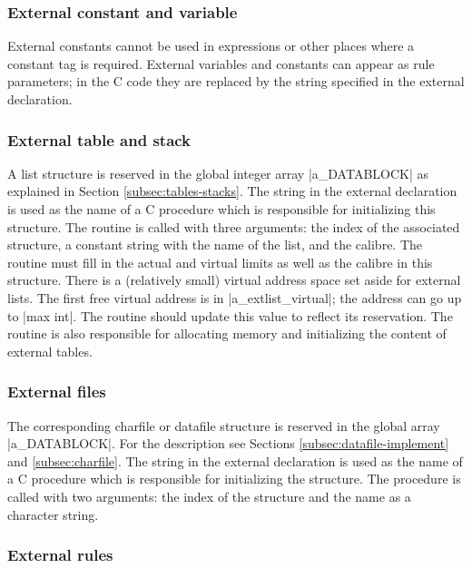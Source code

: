 \documentclass[titlepage]{article}
\newcommand\g[1]{\textsf{\color{blue!90!black}#1}}
\begin{document}
\subsubsection{External constant and variable}

External constants cannot be used in expressions or other places where a
constant tag is required. External variables and constants can appear as
rule parameters; in the {\sf C} code they are replaced by the string
specified in the \g{external declaration}.

\subsubsection{External table and stack}

A list structure is reserved in the global integer array \pp|a\_DATABLOCK|
as explained in Section \ref{subsec:tables-stacks}. The string in the
external declaration is used as the name of a {\sf C} procedure which is
responsible for initializing this structure. The routine is called with
three arguments: the index of the associated structure, a constant string
with the name of the list, and the calibre. The routine must fill in the
actual and virtual limits as well as the calibre in this structure. There is a
(relatively small) virtual address space set aside for external lists. The
first free virtual address is in \pp|a\_extlist\_virtual|; the address can
go up to \pp|max int|. The routine should update this value to reflect its
reservation. The routine is also responsible for allocating memory and
initializing the content of external tables.

\subsubsection{External files}

The corresponding charfile or datafile structure is reserved in the global
array \pp|a\_DATABLOCK|. For the description see Sections
\ref{subsec:datafile-implement} and \ref{subsec:charfile}. The string in the
external declaration is used as the name of a {\sf C} procedure which is
responsible for
initializing the structure. The procedure is called with two arguments:
the index of the structure and the name as a character string.

\subsubsection{External rules}
\end{document}
